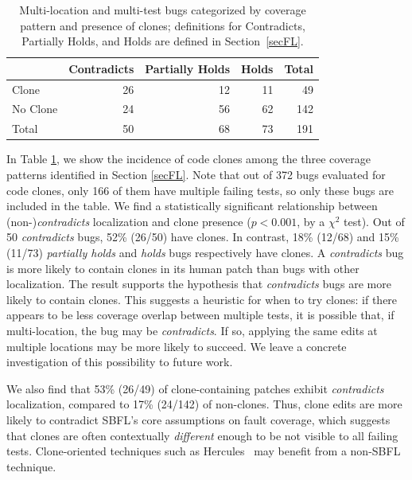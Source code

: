 \documentclass[10pt, conference]{IEEEtran}
\begin{document}
\begin{table}
  {\begin{center}
      \begin{tabular} {lrrrr}
        \toprule
        & Contradicts & Partially Holds & Holds & Total \\
        \midrule
        Clone & 26 & 12 & 11 &  49 \\
        No Clone  & 24 & 56 & 62 & 142 \\
        \midrule
        Total     & 50 & 68 & 73 & 191 \\
        \bottomrule
      \end{tabular}
    \end{center}
  }
  \caption{Multi-location and multi-test bugs categorized by coverage pattern
    and presence of clones; definitions for Contradicts, Partially Holds, and
    Holds are defined in Section~\ref{secFL}.}
  \label{tab:cov_clones}
\end{table}

In Table \ref{tab:cov_clones}, we show the incidence of code clones among the three 
coverage patterns identified in Section \ref{secFL}. Note that out of 372 bugs evaluated for code clones, only 166 of them have multiple failing tests, so only these bugs are included in the table.  
We find a statistically significant relationship between (non-)\emph{contradicts}
localization and clone presence ($p < 0.001$, by a $\chi^2$ test).
Out of 50 \emph{contradicts} bugs, 52\% (26/50) have clones. In contrast,  
18\% (12/68) and 15\% (11/73)
\emph{partially holds} and \emph{holds} bugs respectively have clones.
A \emph{contradicts} bug is more likely to contain clones in its
human patch than bugs with other localization. 
The result supports the hypothesis that \emph{contradicts} bugs are more likely to contain 
clones. This suggests a heuristic for when to try clones: if there
appears to be less coverage overlap between multiple tests, it is
possible that, if multi-location, the bug may be \emph{contradicts}.  If so,
applying the same edits at multiple locations may be more likely to succeed. We
leave a concrete investigation of this possibility to future work.

We also find that 53\% (26/49) of clone-containing patches exhibit 
\emph{contradicts} localization, compared to 17\% (24/142) of non-clones.
Thus, clone edits are more likely to contradict SBFL's core assumptions
on fault coverage, which suggests that clones are often contextually 
\emph{different} enough to be not visible to all failing tests.
Clone-oriented techniques such as Hercules~\cite{saha2019harnessing} may benefit
from a non-SBFL technique.
\end{document}
